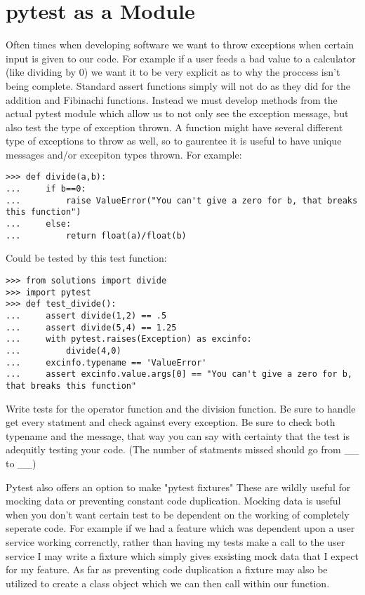 \section*{pytest as a Module}

Often times when developing software we want to throw exceptions when certain input is given to our code.
For example if a user feeds a bad value to a calculator (like dividing by 0) we want it to be very explicit as to why the proccess isn't being complete.
Standard assert functions simply will not do as they did for the addition and Fibinachi functions.
Instead we must develop methods from the actual pytest module which allow us to not only see the exception message, but also test the type of exception thrown.
A function might have several different type of exceptions to throw as well, so to gaurentee it is useful to have unique messages and/or excepiton types thrown.
For example:

\begin{lstlisting}
>>> def divide(a,b):
...     if b==0:
...         raise ValueError("You can't give a zero for b, that breaks this function")
...     else:
...         return float(a)/float(b)
\end{lstlisting}
Could be tested by this test function:
\begin{lstlisting}
>>> from solutions import divide
>>> import pytest
>>> def test_divide():
...     assert divide(1,2) == .5
...     assert divide(5,4) == 1.25
...     with pytest.raises(Exception) as excinfo:
...         divide(4,0)
...     excinfo.typename == 'ValueError'
...     assert excinfo.value.args[0] == "You can't give a zero for b, that breaks this function"
\end{lstlisting}

\begin{problem}
Write tests for the operator function and the division function. Be sure to handle get every statment and check against every exception.
Be sure to check both typename and the message, that way you can say with certainty that the test is adequitly testing your code.
(The number of statments missed should go from \_\_ to \_\_)
\end{problem}

Pytest also offers an option to make "pytest fixtures" These are wildly useful for mocking data or preventing constant code duplication.
Mocking data is useful when you don't want certain test to be dependent on the working of completely seperate code.
For example if we had a feature which was dependent upon a user service working correnctly, rather than having my tests make a call to the user service I may write a fixture which simply gives exsisting mock data that I expect for my feature.
As far as preventing code duplication a fixture may also be utilized to create a class object which we can then call within our function.

